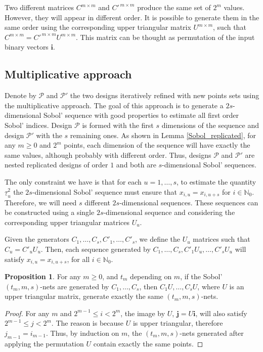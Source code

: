 \documentclass[]{elsarticle}
\theoremstyle{definition}
\newtheorem{prop}{Proposition}
\newcommand{\bvec}[1]{\boldsymbol{#1}}
\newcommand{\vi}{\bvec{i}}
\newcommand{\vj}{\bvec{j}}
\begin{document}
Two different matrices $C^{m\times m}$ and $C'^{\,m\times m}$ produce the same set of $2^m$ values. However, they will appear in different order. It is possible to generate them in the same order using the corresponding upper triangular matrix $U^{m\times m}$, such that $C^{m\times m}=C'^{\,m\times m}U^{m\times m}$. This matrix can be thought as permutation of the input binary vectors $\vi$.

\subsection{Multiplicative approach}
Denote by $\mathcal{P}$ and $\mathcal{P}'$ the two designs iteratively refined with new points sets using the multiplicative approach. %
The goal of this approach is to generate a $2s$-dimensional Sobol' sequence with good properties to estimate all first order Sobol' indices. Design $\mathcal{P}$ is formed with the first $s$ dimensions of the sequence and design $\mathcal{P}'$ with the $s$ remaining ones. As shown in Lemma \ref{Sobol_replicated}, for any $m\geq 0$ and $2^m$ points, each dimension of the sequence will have exactly the same values, although probably with different order. Thus, designs $\mathcal{P}$ and $\mathcal{P}'$ are nested replicated designs of order $1$ and both are $s$-dimensional Sobol' sequences.

The only constraint we have is that for each $u=1,\dots,s$, to estimate the quantity $\underline{\tau}_u^2$ the $2s$-dimensional Sobol' sequence must ensure that $x_{i,u}=x_{i,u+s}$ for $i\in\mathbb{N}_0$. Therefore, we will need $s$ different $2s$-dimensional sequences. These sequences can be constructed using a single $2s$-dimensional sequence and considering the corresponding upper triangular matrices $U_u$.

Given the generators $C_1,\dots,C_s,C'_1,\dots,C'_s$, we define the $U_u$ matrices such that $C_u=C'_uU_u$. Then, each sequence generated by $C_1,\dots,C_s,C'_1U_u,\dots,C'_sU_u$ will satisfy $x_{i,u}=x_{i,u+s}$, for all $i\in\mathbb{N}_0$.

\begin{prop}
For any $m\geq 0$, and $t_m$ depending on $m$, if the Sobol' $(t_m,m,s)$-nets are generated by $C_1,\dots,C_s$, then $C_1U,\dots,C_sU$, where $U$ is an upper triangular matrix, generate exactly the same $(t_m,m,s)$-nets.
\end{prop}
\begin{proof}
For any $m$ and $2^{m-1}\leq i < 2^m$, the image by $U$, $\vj=U\vi$, will also satisfy $2^{m-1}\leq j < 2^m$. The reason is because $U$ is upper triangular, therefore $j_{m-1}=i_{m-1}$. Thus, by induction on $m$, the $(t_m,m,s)$-nets generated after applying the permutation $U$ contain exactly the same points.
\end{proof}
\end{document}
